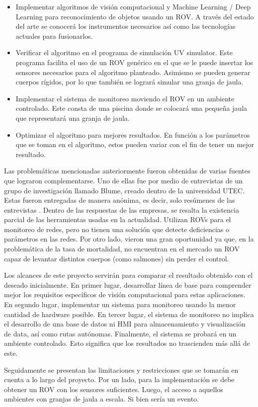 \begin{itemize}
    \item Implementar algoritmos de visión computacional y Machine Learning / Deep Learning para reconocimiento de objetos usando un ROV. A través del estado del arte se conocerá los instrumentos necesarios así como las tecnologías actuales para fusionarlos.
    \item Verificar el algoritmo en el programa de simulación UV simulator. Este programa facilita el uso de un ROV genérico en el que se le puede insertar los sensores necesarios para el algoritmo planteado. Asimismo se pueden generar cuerpos rígidos, por lo que también se logrará simular una granja de jaula.
    \item Implementar el sistema de monitoreo moviendo el ROV en un ambiente controlado. Este consta de una piscina donde se colocará una pequeña jaula que representará una granja de jaula.
    \item Optimizar el algoritmo para mejores resultados. En función a los parámetros que se toman en el algoritmo, estos pueden variar con el fin de tener un mejor resultado.
\end{itemize}


Las problemáticas mencionadas anteriormente fueron obtenidas de varias fuentes que lograron complementarse. Uno de ellas fue por medio de entrevistas de un grupo de investigación llamado Blume, creado dentro de la universidad UTEC. Estas fueron entregadas de manera anónima, es decir, solo resúmenes de las entrevistas \cite{Entrevistas_Blume}. Dentro de las respuestas de las empresas, se resalta la existencia parcial de las herramientas usadas en la actualidad. Utilizan ROVs para el monitoreo de redes, pero no tienen una solución que detecte deficiencias o parámetros en las redes. Por otro lado, vieron una gran oportunidad ya que, en la problemática de la tasa de mortalidad, no encuentran en el mercado un ROV capaz de levantar distintos cuerpos (como salmones) sin perder el control. 


Los alcances de este proyecto servirán para comparar el resultado obtenido con el deseado inicialmente. En primer lugar, desarrollar línea de base para comprender mejor los requisitos específicos de visión computacional para estas aplicaciones. En segundo lugar, implementar un sistema para monitoreo usando la menor cantidad de hardware posible. En tercer lugar, el sistema de monitoreo no implica el desarrollo de una base de datos ni HMI para almacenamiento y visualización de data, así como rutas autónomas. Finalmente, el sistema se probará en un ambiente controlado. Esto significa que los resultados no trascienden más allá de este. 

Seguidamente se presentan las limitaciones y restricciones que se tomarán en cuenta a lo largo del proyecto. Por un lado, para la implementación se debe obtener un ROV con los sensores suficientes. Luego, el acceso a aquellos ambientes con granjas de jaula a escala. Si bien sería un evento.